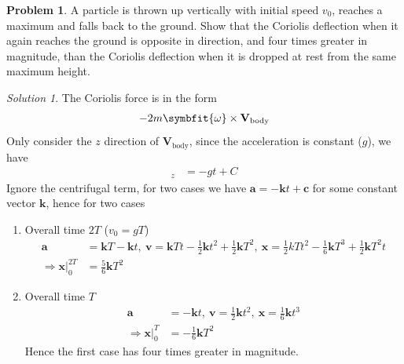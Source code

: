 \documentclass[twoside,11pt]{article}
\newcommand{\lms}{\fontfamily{lmss}\selectfont} %
\theoremstyle{definition}
\newtheorem{problem}{\lms Problem}
\theoremstyle{remark}
\newtheorem*{solution}{Solution}
\begin{document}
\begin{problem}
A particle is thrown up vertically with initial speed $v_0$, reaches a maximum
and falls back to the ground. Show that the Coriolis deflection when it again 
reaches the ground is opposite in direction, and four times greater in magnitude,
than the Coriolis deflection when it is dropped at rest from the same maximum
height.
\end{problem}
\begin{solution} 
The Coriolis force is in the form 
\begin{align*}
    -2m\symbfit{\omega}\times\mathbf{V}_\text{body}
\end{align*}
Only consider the $z$ direction of $\mathbf{V}_\text{body}$, since the 
acceleration is constant ($g$), we have 
\begin{align*}
    [\mathbf{V}_\text{body}]_z &= -gt + C
\end{align*}
Ignore the centrifugal term, for two cases we have $\mathbf{a}=-\mathbf{k}t+\mathbf{c}$
for some constant vector $\mathbf{k}$, hence for two cases
\begin{enumerate}[label=\roman*.]
\item Overall time $2T$ ($v_0 = gT$)
\begin{align*}
    \mathbf{a} &= \mathbf{k}T - \mathbf{k}t,~
    \mathbf{v} = \mathbf{k}Tt - \frac{1}{2}\mathbf{k}t^2 + \frac{1}{2}\mathbf k T^2,~
    \mathbf{x} = \frac{1}{2}kTt^2 - \frac{1}{6}\mathbf{k}T^3 + \frac{1}{2} \mathbf kT^2 t\\
    \Rightarrow \left. \mathbf{x}\right|_0^{2T} &= 
    \frac{5}{6}\mathbf k T^2
\end{align*}

\item Overall time $T$
\begin{align*}
    \mathbf{a} &= -\mathbf k t,~
    \mathbf{v} = \frac{1}{2}\mathbf{k}t^2,~
    \mathbf{x} = \frac{1}{6}\mathbf{k}t^3\\
    \Rightarrow \left. \mathbf{x}\right|_0^{T} &= 
    -\frac{1}{6}\mathbf k T^2
\end{align*}
Hence the first case has four times greater in magnitude.

\end{enumerate}
\end{solution}
\end{document}
